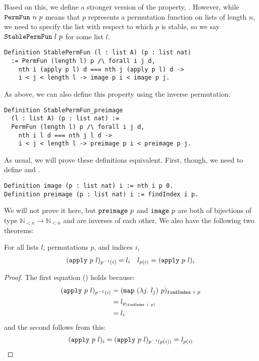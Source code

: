\documentclass[sigplan,10pt,anonymous,review]{thesis}
\begin{document}
Based on this, we define a stronger version of the 
property, . However, while $\texttt{\textup{PermFun}}~n~p$
means that $p$ represents a permutation function on lists of length
$n$, we need to specify the list with respect to which $p$ is stable,
so we say $\texttt{\textup{StablePermFun}}~l~p$ for some list $l$.
\begin{lstlisting}
Definition StablePermFun (l : list A) (p : list nat)
  := PermFun (length l) p /\ forall i j d,
    nth i (apply p l) d === nth j (apply p l) d ->
    i < j < length l -> image p i < image p j.
\end{lstlisting}
As above, we can also define this
property using the inverse permutation:
\begin{lstlisting}
Definition StablePermFun_preimage
  (l : list A) (p : list nat) :=
  PermFun (length l) p /\ forall i j d,
    nth i l d === nth j l d ->
    i < j < length l -> preimage p i < preimage p j.
\end{lstlisting}

As usual, we will prove these
definitions equivalent. First, though, we need to define 
and .
\begin{lstlisting}
Definition image (p : list nat) i := nth i p 0.
Definition preimage (p : list nat) i := findIndex i p.
\end{lstlisting}
We will not prove it here, but $\texttt{\textup{preimage}}~p$ and $\texttt{\textup{image}}~p$
are both of bijections of type $\mathbb{N}_{<n} \to \mathbb{N}_{<n}$ and
are inverses of each other. We also have the following two theorems:
\begin{theorem}
  For all lists $l$, permutations $p$, and indices $i$,
  \begin{align*}
    (\texttt{\textup{apply}}~p~l)_{p^{-1}(i)} = l_i && l_{p(i)} = (\texttt{\textup{apply}}~p~l)_i
  \end{align*}
\end{theorem}
\begin{proof}
  The first equation () holds because:
  \begin{align*}
       (\texttt{\textup{apply}}~p~l)_{p^{-1}(i)}
    &= (\texttt{\textup{map}}~(\lambda j.~l_j)~p)_{\texttt{\textup{findIndex}}~i~p} \\
    &= l_{p_{(\texttt{\textup{findIndex}}~i~p)}} \\
    &= l_i
  \end{align*}
  and the second follows from this:
  \begin{equation*}
      (\texttt{\textup{apply}}~p~l)_i
    = (\texttt{\textup{apply}}~p~l)_{p^{-1}(p(i))}
    = l_{p(i)}
    \qedhere
  \end{equation*}
\end{proof}
\end{document}
